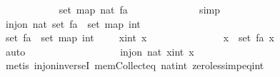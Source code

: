 \begin{isabellebody}
\ \ \ \ \ \ \ \ \ \ \isamarkupfalse%
\ {\isacharbackquoteopen}set\ {\isacharparenleft}map\ nat\ {\isacharquery}fa{\isacharparenright}\ {\isacharequal}\ {\isacharbraceleft}{}{\isachardot}{\isachardot}{\isacharless}{}{}{}{}{\isacharplus}{}{\isacharbraceright}{\isacharbackquoteclose}\isanewline
\ \ \ \ \ \ \ \ \ \ \isamarkupfalse%
\ simp\isanewline
\ \ \ \ \ \ \isamarkupfalse%
\isanewline
\ \ \ \ \isamarkupfalse%
\isanewline
\ \ \ \ \ \ \isamarkupfalse%
\ {\isachardoublequoteopen}inj{\isacharunderscore}on\ nat\ {\isacharparenleft}set\ {\isacharquery}fa\ {\isasymunion}\ set\ {\isacharparenleft}map\ int\ {\isacharbrackleft}{}{\isachardot}{\isachardot}{\isacharless}{}{}{}{}\ {\isacharplus}\ {}{\isacharbrackright}{\isacharparenright}{\isacharparenright}{\isachardoublequoteclose}\isanewline
\ \ \ \ \ \ \isamarkupfalse%
{\isacharminus}\isanewline
\ \ \ \ \ \ \ \ \isamarkupfalse%
\ {\isachardoublequoteopen}set\ {\isacharquery}fa\ {\isasymunion}\ set\ {\isacharparenleft}map\ int\ {\isacharbrackleft}{}{\isachardot}{\isachardot}{\isacharless}{}{}{}{}\ {\isacharplus}\ {}{\isacharbrackright}{\isacharparenright}\ {\isasymsubseteq}\ {\isacharbraceleft}x{\isacharcolon}{\isacharcolon}int{\isachardot}\ x\ {\isachargreater}\ {}{\isacharbraceright}{\isachardoublequoteclose}\isanewline
\ \ \ \ \ \ \ \ \ \ \isamarkupfalse%
\ {\isacharbackquoteopen}{\isasymforall}\ x\ {\isasymin}\ set\ {\isacharquery}fa{\isachardot}\ x\ {\isachargreater}\ {}{\isacharbackquoteclose}\isanewline
\ \ \ \ \ \ \ \ \ \ \isamarkupfalse%
\ auto\isanewline
\ \ \ \ \ \ \ \ \isamarkupfalse%
\isanewline
\ \ \ \ \ \ \ \ \isamarkupfalse%
\ {\isachardoublequoteopen}inj{\isacharunderscore}on\ nat\ {\isacharbraceleft}x{\isacharcolon}{\isacharcolon}int{\isachardot}\ x\ {\isachargreater}\ {}{\isacharbraceright}{\isachardoublequoteclose}\isanewline
\ \ \ \ \ \ \ \ \ \ \isamarkupfalse%
\ {\isacharparenleft}metis\ inj{\isacharunderscore}on{\isacharunderscore}inverseI\ mem{\isacharunderscore}Collect{\isacharunderscore}eq\ nat{\isacharunderscore}int\ zero{\isacharunderscore}less{\isacharunderscore}imp{\isacharunderscore}eq{\isacharunderscore}int{\isacharparenright}\isanewline

\end{isabellebody}

